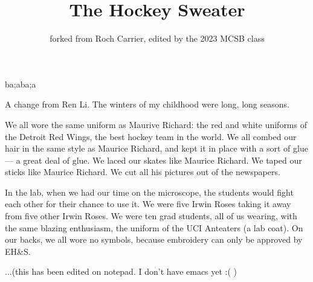 \documentclass{article}
\title{The Hockey Sweater}
\author{forked from Roch Carrier, edited by the 2023 MCSB class}
\begin{document}
\maketitle
ba;aba;a

A change from Ren Li.
The winters of my childhood were long, long seasons.


We all wore the same uniform as Maurive Richard: 
the red and white uniforms of the Detroit Red Wings, the best hockey team in the world.
We all combed our hair in the same style as Maurice Richard, 
and kept it in place with a sort of glue --- a great deal of glue.
We laced our skates like Maurice Richard.
We taped our sticks like Maurice Richard.
We cut all his pictures out of the newspapers.


In the lab, when we had our time on the microscope, the students would fight each other for their chance to use it.
We were five Irwin Roses taking it away from five other Irwin Roses.
We were ten grad students, all of us wearing, with the same blazing enthusiasm, the uniform of the UCI Anteaters (a lab coat).
On our backs, we all wore no symbols, because embroidery can only be approved by EH\&S.

...(this has been edited on notepad. I don't have emacs yet :( )
\end{document}

